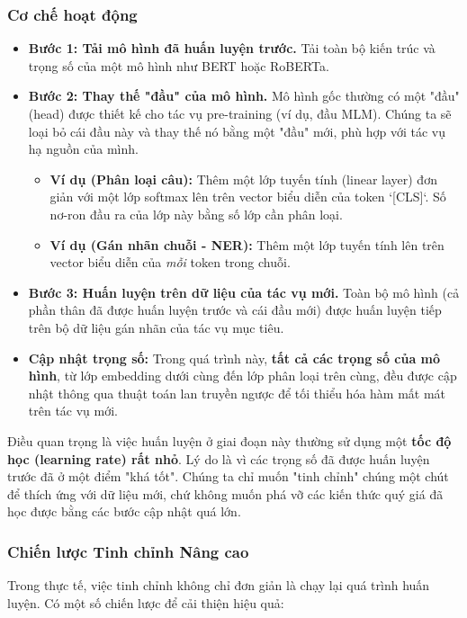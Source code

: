 \subsubsection{Cơ chế hoạt động}
\begin{itemize}
    \item \textbf{Bước 1: Tải mô hình đã huấn luyện trước.} Tải toàn bộ kiến trúc và trọng số của một mô hình như BERT hoặc RoBERTa.
    \item \textbf{Bước 2: Thay thế "đầu" của mô hình.} Mô hình gốc thường có một "đầu" (head) được thiết kế cho tác vụ pre-training (ví dụ, đầu MLM). Chúng ta sẽ loại bỏ cái đầu này và thay thế nó bằng một "đầu" mới, phù hợp với tác vụ hạ nguồn của mình.
        \begin{itemize}
            \item \textbf{Ví dụ (Phân loại câu):} Thêm một lớp tuyến tính (linear layer) đơn giản với một lớp softmax lên trên vector biểu diễn của token `[CLS]`. Số nơ-ron đầu ra của lớp này bằng số lớp cần phân loại.
            \item \textbf{Ví dụ (Gán nhãn chuỗi - NER):} Thêm một lớp tuyến tính lên trên vector biểu diễn của \textit{mỗi} token trong chuỗi.
        \end{itemize}
    \item \textbf{Bước 3: Huấn luyện trên dữ liệu của tác vụ mới.} Toàn bộ mô hình (cả phần thân đã được huấn luyện trước và cái đầu mới) được huấn luyện tiếp trên bộ dữ liệu gán nhãn của tác vụ mục tiêu.
    \item \textbf{Cập nhật trọng số:} Trong quá trình này, \textbf{tất cả các trọng số của mô hình}, từ lớp embedding dưới cùng đến lớp phân loại trên cùng, đều được cập nhật thông qua thuật toán lan truyền ngược để tối thiểu hóa hàm mất mát trên tác vụ mới.
\end{itemize}
Điều quan trọng là việc huấn luyện ở giai đoạn này thường sử dụng một \textbf{tốc độ học (learning rate) rất nhỏ}. Lý do là vì các trọng số đã được huấn luyện trước đã ở một điểm "khá tốt". Chúng ta chỉ muốn "tinh chỉnh" chúng một chút để thích ứng với dữ liệu mới, chứ không muốn phá vỡ các kiến thức quý giá đã học được bằng các bước cập nhật quá lớn.

\subsubsection{Chiến lược Tinh chỉnh Nâng cao}
Trong thực tế, việc tinh chỉnh không chỉ đơn giản là chạy lại quá trình huấn luyện. Có một số chiến lược để cải thiện hiệu quả:
